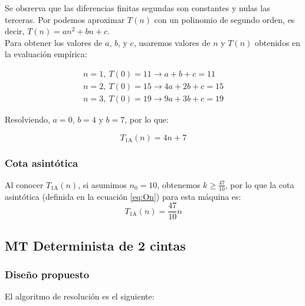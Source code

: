 Se obsrerva que las diferencias finitas segundas son constantes y nulas las terceras. Por podemos aproximar $T(n)$ con un polinomio de segundo orden, es decir, $T(n) = an^2 + bn + c$.\\

Para obtener los valores de $a$, $b$, y $c$, usaremos valores de $n$ y $T(n)$ obtenidos en la evaluación empírica:

\begin{subequations}
    \begin{gather}
        n = 1,\ T(0) = 11 \rightarrow a + b + c = 11 \\
        n = 2,\ T(0) = 15 \rightarrow 4a + 2b + c = 15 \\
        n = 3,\ T(0) = 19 \rightarrow 9a + 3b + c = 19
    \end{gather}
\end{subequations}

Resolviendo, $a=0$, $b=4$ y $b=7$, por lo que:

\begin{equation}
    T_{\mathrm{1A}}(n) = 4n + 7
\end{equation}

\subsubsection*{Cota asintótica}
Al conocer $T_{\mathrm{1A}}(n)$, si asumimos $n_0 = 10$, obtenemos $k \geq \frac{47}{10}$, por lo que la cota asintótica (definida en la ecuación \ref{eq:On}) para esta máquina es:
\begin{equation}
    T_{\mathrm{1A}}(n) = \frac{47}{10} n
\end{equation}



\subsection{MT Determinista de 2 cintas}

\subsubsection*{Diseño propuesto}
El algoritmo de resolución es el siguiente:

